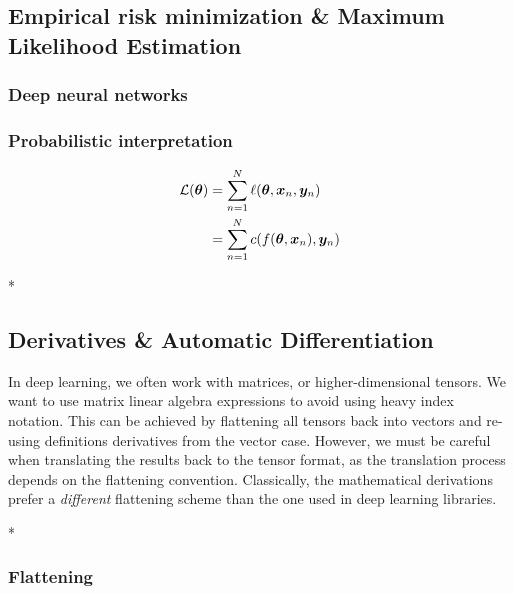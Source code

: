 \subsection{Empirical risk minimization \& Maximum Likelihood Estimation}

\subsubsection{Deep neural networks}

\subsubsection{Probabilistic interpretation}


\begin{align}
  {\mathcal{L}}({\bm{\theta}}) &= \sum_{n=1}^N \ell({\bm{\theta}}, {\bm{x}}_n, {\bm{y}}_n)
  \\
               &=
                 \sum_{n=1}^N c(f({\bm{\theta}}, {\bm{x}}_n), {\bm{y}}_n)
\end{align}

\switchcolumn[0]

\blindtext

\switchcolumn[1]

\switchcolumn[0]* %

\blindtext

\subsection{Derivatives \& Automatic Differentiation}

\begin{caveat}
  In deep learning, we often work with matrices, or higher-dimensional tensors.
  We want to use matrix linear algebra expressions to avoid using heavy index notation.
  This can be achieved by flattening all tensors back into vectors and re-using definitions derivatives from the vector case.
  However, we must be careful when translating the results back to the tensor format, as the translation process depends on the flattening convention.
  Classically, the mathematical derivations prefer a \emph{different} flattening scheme than the one used in deep learning libraries.
\end{caveat}

\switchcolumn[0]*
\subsubsection{Flattening}


